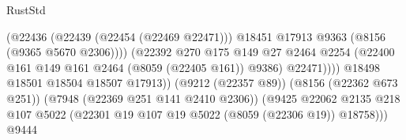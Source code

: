 \begin{lexlean}{RustStd}
\begin{coremodule}
{\begin{coremodule}
{{{{{{{{{{{{{{{{{{{{{{{{{{{{{{{{{{                                                        (@22436
                                                          (@22439 (@22454 (@22469 @22471)))
                                                          @18451
                                                          @17913
                                                          @9363
                                                          (@8156 (@9365 @5670 @2306))))
                                                      (@22392
                                                        @270
                                                        @175
                                                        @149
                                                        @27
                                                        @2464
                                                        @2254
                                                        (@22400
                                                          @161
                                                          @149
                                                          @161
                                                          @2464
                                                          (@8059 (@22405 @161))
                                                          @9386)
                                                        @22471))))
                                                @18498
                                                @18501
                                                @18504
                                                @18507
                                                @17913))
                                            (@9212 (@22357 @89))
                                            (@8156 (@22362 @673 @251))
                                            (@7948 (@22369 @251 @141 @2410 @2306))
                                            (@9425
                                              @22062
                                              @2135
                                              @218
                                              @107
                                              @5022
                                              (@22301
                                                @19
                                                @107
                                                @19
                                                @5022
                                                (@8059 (@22306 @19))
                                                @18758)))
                                          @9444
}}}}}}}}}}}}}}}}}}}}}}}}}}}}}}}}}}
\end{coremodule}}
\end{coremodule}
\end{lexlean}
